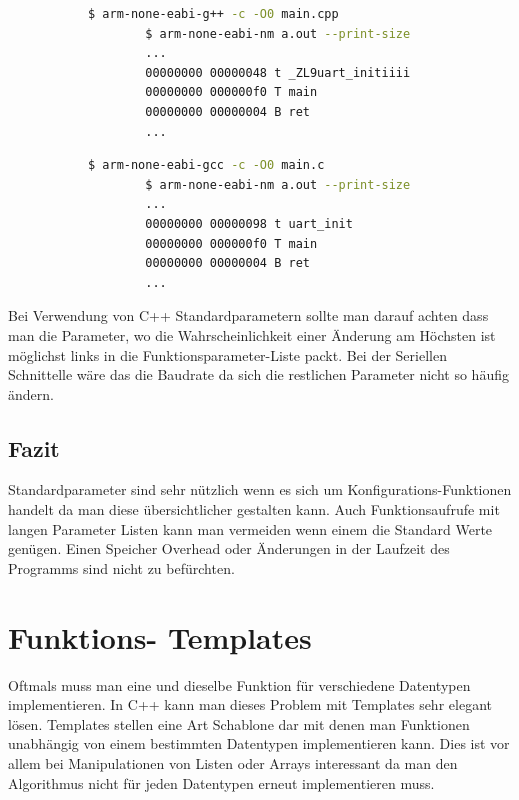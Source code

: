\documentclass[MES,Master,ngerman]{twbook}%
\begin{document}
\begin{figure}[!htb]
	\begin{subfigure}[b]{0.5\textwidth}
		\begin{lstlisting}[gobble=6, title={Analyse C++}, language=bash, numbers=none]
		$ arm-none-eabi-g++ -c -O0 main.cpp
		$ arm-none-eabi-nm a.out --print-size
		...
		00000000 00000048 t _ZL9uart_initiiii
		00000000 000000f0 T main
		00000000 00000004 B ret
		...
		\end{lstlisting}
	\end{subfigure}
	\begin{subfigure}[b]{0.5\textwidth}
		\begin{lstlisting}[gobble=6, title={Analyse C}, language=bash, numbers=none]
		$ arm-none-eabi-gcc -c -O0 main.c
		$ arm-none-eabi-nm a.out --print-size
		...
		00000000 00000098 t uart_init
		00000000 000000f0 T main
		00000000 00000004 B ret
		...
		\end{lstlisting}
	\end{subfigure}
\end{figure}
Bei Verwendung von C++ Standardparametern sollte man darauf achten dass man die Parameter, wo die Wahrscheinlichkeit einer Änderung am Höchsten ist möglichst links in die Funktionsparameter-Liste packt. Bei der Seriellen Schnittelle wäre das die Baudrate da sich die restlichen Parameter nicht so häufig ändern.  

\subsection{Fazit}
Standardparameter sind sehr nützlich wenn es sich um Konfigurations-Funktionen handelt da man diese übersichtlicher gestalten kann. Auch Funktionsaufrufe mit langen Parameter Listen kann man vermeiden wenn einem die Standard Werte genügen. Einen Speicher Overhead oder Änderungen in der Laufzeit des Programms sind nicht zu befürchten.

\newpage

\section{Funktions- Templates}
Oftmals muss man eine und dieselbe Funktion für verschiedene Datentypen implementieren. In C++ kann man dieses Problem mit Templates sehr elegant lösen. Templates stellen eine Art Schablone dar mit denen man Funktionen unabhängig von einem bestimmten Datentypen implementieren kann. Dies ist vor allem bei Manipulationen von Listen oder Arrays interessant da man den Algorithmus nicht für jeden Datentypen erneut implementieren muss.
\end{document}
